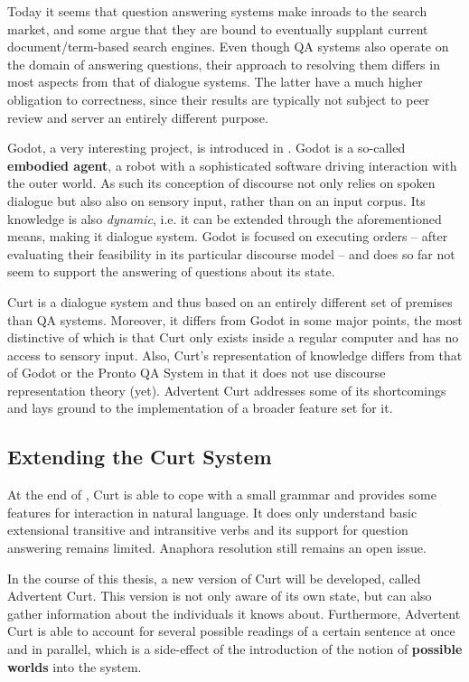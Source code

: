 \documentclass[a4paper]{article}
\newcommand{\abbr}{\textsf} %
\newcommand{\term}[1]{\textsf{\textbf{#1}}} %
\newcommand{\pn}{\textsf} %
\newcommand{\curt}{\pn{Curt}}
\newcommand{\acurt}{\pn{Advertent Curt}}
\theoremstyle{remark}
\theoremstyle{remark}
\theoremstyle{definition}
\theoremstyle{definition}
\begin{document}
Today it seems that question answering systems make inroads to the search market,
and some argue that they are bound to eventually supplant current document/term-based
search engines. Even though \abbr{QA} systems also operate on the domain of
answering questions, their approach to resolving them differs in most aspects
from that of dialogue systems. The latter have a much higher obligation to
correctness, since their results are typically not subject to peer
review and server an entirely different purpose.

\pn{Godot}, a very interesting project, is introduced in \cite{godot}.
\pn{Godot} is a so-called \term{embodied agent}, a robot with a sophisticated
software driving interaction with the outer world. As such its conception of
discourse not only relies on spoken dialogue but also also on sensory input, rather
than on an input corpus. Its knowledge is also \emph{dynamic}, i.e. it can be
extended through the aforementioned means, making it
dialogue system.
\pn{Godot} is focused on executing orders -- after evaluating their feasibility
in its particular discourse model -- and does so far not seem to support the answering
of questions about its state.

\curt{} is a dialogue system and thus based on an entirely different set of
premises than \abbr{QA} systems. Moreover, it differs from \pn{Godot} in some
major points, the most distinctive of which is that \curt{} only exists inside a
regular computer and has no access to sensory input. Also, \curt's
representation of knowledge differs from that of \pn{Godot} or the \pn{Pronto QA
System} in that it does not use discourse representation theory (yet). \acurt{}
addresses some of its shortcomings and lays ground to the implementation of a
broader feature set for it.

\subsection{Extending the Curt System}\label{sec:extension}

At the end of \cite{blackburnbos:cl1}, \curt{} is able to cope with a small
grammar and provides some features for interaction in natural
language. It does only understand basic extensional transitive and intransitive
verbs and its support for question answering remains limited.
Anaphora resolution still remains an open issue.

In the course of this thesis, a new version of \curt{} will be developed, called
\acurt. This version is not only aware of its own state, but can also gather
information about the individuals it knows about. Furthermore, \acurt{} is able
to account for several possible readings of a certain sentence at once and in
parallel, which is a side-effect of the introduction of the notion of
\term{possible worlds} into the system.
\end{document}
